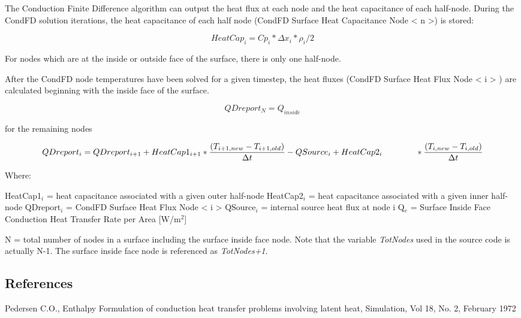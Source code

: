 The Conduction Finite Difference algorithm can output the heat flux at each node and the heat capacitance of each half-node. During the CondFD solution iterations, the heat capacitance of each half node (CondFD Surface Heat Capacitance Node \textless{} n \textgreater{}) is stored:

\begin{equation}
{HeatCap_{i} = Cp_{i}*\Delta x_{i}*\rho_{i}/2}
\end{equation}

For nodes which are at the inside or outside face of the surface, there is only one half-node.

After the CondFD node temperatures have been solved for a given timestep, the heat fluxes (CondFD Surface Heat Flux Node \textless{} i \textgreater{} ) are calculated beginning with the inside face of the surface.

\begin{equation}
{QDreport_{N} = Q_{inside}}
\end{equation}

for the remaining nodes

\begin{equation}
{QDreport_{i} = QDreport_{i+1}+HeatCap1_{i+1}* \frac{\left(T_{i+1,new}-T_{i+1,old}\right)}{\Delta t}-QSource_{i}+HeatCap2_{i} \\
\quad \quad \quad \quad * \frac{\left(T_{i,new}-T_{i,old}\right)}{\Delta t}}
\end{equation}

Where:

HeatCap1\(_{i}\) = heat capacitance associated with a given outer half-node HeatCap2\(_{i}\) = heat capacitance associated with a given inner half-node QDreport\(_{i}\) = CondFD Surface Heat Flux Node \textless{} i \textgreater{} QSource\(_{i}\) = internal source heat flux at node i Q\(_{e}\) = Surface Inside Face Conduction Heat Transfer Rate per Area {[}W/m\(^{2}\){]}

N = total number of nodes in a surface including the surface inside face node. Note that the variable \emph{TotNodes} used in the source code is actually N-1. The surface inside face node is referenced as \emph{TotNodes+1}.

\subsection{References}\label{references-013}

Pedersen C.O., Enthalpy Formulation of conduction heat transfer problems involving latent heat, Simulation, Vol 18, No. 2, February 1972

